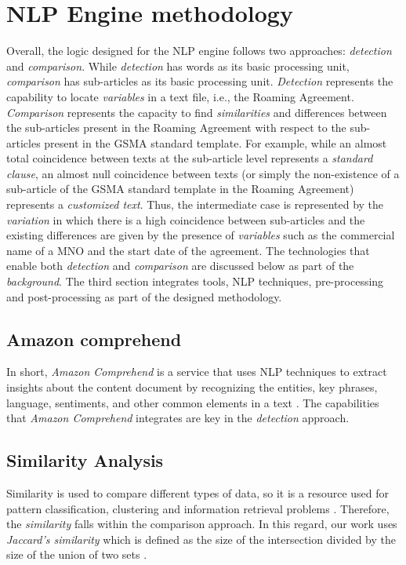\documentclass[conference]{style/IEEEtran}
\begin{document}
\section{NLP Engine methodology}
Overall, the logic designed for the NLP engine follows two approaches: \textit{detection} and \textit{comparison}. While \textit{detection} has words as its basic processing unit, \textit{comparison} has sub-articles as its basic processing unit. \textit{Detection} represents the capability to locate \textit{variables} in a text file, i.e., the Roaming Agreement. \textit{Comparison} represents the capacity to find \textit{similarities} and differences between the sub-articles present in the Roaming Agreement with respect to the sub-articles present in the GSMA standard template. For example, while an almost total coincidence between texts at the sub-article level represents a \textit{standard clause}, an almost null coincidence between texts (or simply the non-existence of a sub-article of the GSMA standard template in the Roaming Agreement) represents a \textit{customized text}. Thus, the intermediate case is represented by the \textit{variation} in which there is a high coincidence between sub-articles and the existing differences are given by the presence of \textit{variables} such as the commercial name of a MNO and the start date of the agreement. The technologies that enable both \textit{detection} and \textit{comparison} are discussed below as part of the \textit{background}. The third section integrates tools, NLP techniques, pre-processing and post-processing as part of the designed methodology.

\subsection{Amazon comprehend}
In short, \textit{Amazon Comprehend} is a service that uses NLP techniques to extract insights about the content document by recognizing  the  entities,  key  phrases,  language,  sentiments,  and  other  common  elements  in  a  text \cite{AWS2021}. The capabilities that \textit{Amazon Comprehend} integrates are key in the \textit{detection} approach.

\subsection{Similarity Analysis}
Similarity is used to compare different types of data, so it is a resource used for pattern classification, clustering and information retrieval problems \cite{7429408}. Therefore, the \textit{similarity} falls within the comparison approach. In this regard, our work uses  \textit{Jaccard's similarity} which is defined as the size of the intersection divided by the size of the union of two sets \cite{Gupta2018}.
\end{document}

